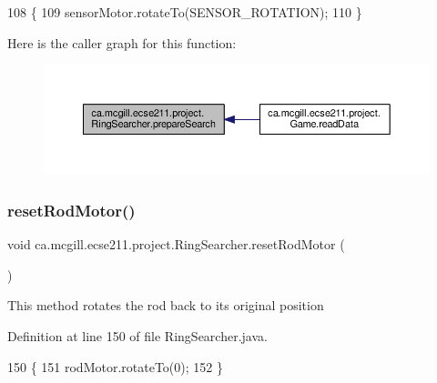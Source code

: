 \begin{DoxyCode}
108                               \{
109     sensorMotor.rotateTo(SENSOR\_ROTATION);
110   \}
\end{DoxyCode}
Here is the caller graph for this function\+:\nopagebreak
\begin{figure}[H]
\begin{center}
\leavevmode
\includegraphics[width=350pt]{classca_1_1mcgill_1_1ecse211_1_1project_1_1_ring_searcher_abf31c36cadb144a4651b11f7fa37120a_icgraph}
\end{center}
\end{figure}
\mbox{\label{classca_1_1mcgill_1_1ecse211_1_1project_1_1_ring_searcher_a8b0ea0bf4cd07b6c8a090c3e9bc8eb04}} 
\subsubsection{\texorpdfstring{reset\+Rod\+Motor()}{resetRodMotor()}}
{\footnotesize\ttfamily void ca.\+mcgill.\+ecse211.\+project.\+Ring\+Searcher.\+reset\+Rod\+Motor (\begin{DoxyParamCaption}{ }\end{DoxyParamCaption})}

This method rotates the rod back to its original position 

Definition at line 150 of file Ring\+Searcher.\+java.


\begin{DoxyCode}
150                               \{
151     rodMotor.rotateTo(0);
152   \}
\end{DoxyCode}
\mbox{\label{classca_1_1mcgill_1_1ecse211_1_1project_1_1_ring_searcher_ad73c50b29163d91292de418101cce21e}} 
